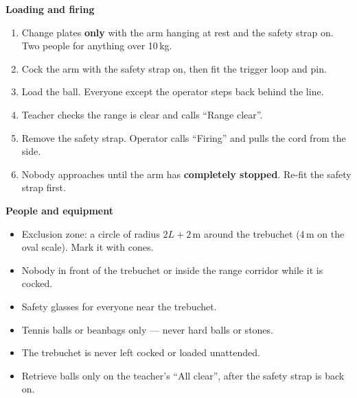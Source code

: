 \documentclass[11pt,a4paper]{article}
\begin{document}
\begin{minipage}[t]{0.48\linewidth}
\textbf{Loading and firing}
\begin{enumerate}[itemsep=1pt, leftmargin=1.5em, topsep=1pt]
  \item Change plates \textbf{only} with the arm hanging at rest and the safety strap on. Two people for anything over 10\,kg.
  \item Cock the arm with the safety strap on, then fit the trigger loop and pin.
  \item Load the ball. Everyone except the operator steps back behind the line.
  \item Teacher checks the range is clear and calls ``Range clear''.
  \item Remove the safety strap. Operator calls ``Firing'' and pulls the cord from the side.
  \item Nobody approaches until the arm has \textbf{completely stopped}. Re-fit the safety strap first.
\end{enumerate}
\end{minipage}\hfill
\begin{minipage}[t]{0.48\linewidth}
\textbf{People and equipment}
\begin{itemize}[itemsep=1pt, leftmargin=1.2em, topsep=1pt]
  \item Exclusion zone: a circle of radius $2L + 2$\,m around the trebuchet (4\,m on the oval scale). Mark it with cones.
  \item Nobody in front of the trebuchet or inside the range corridor while it is cocked.
  \item Safety glasses for everyone near the trebuchet.
  \item Tennis balls or beanbags only --- never hard balls or stones.
  \item The trebuchet is never left cocked or loaded unattended.
  \item Retrieve balls only on the teacher's ``All clear'', after the safety strap is back on.
\end{itemize}
\end{minipage}
\end{document}
